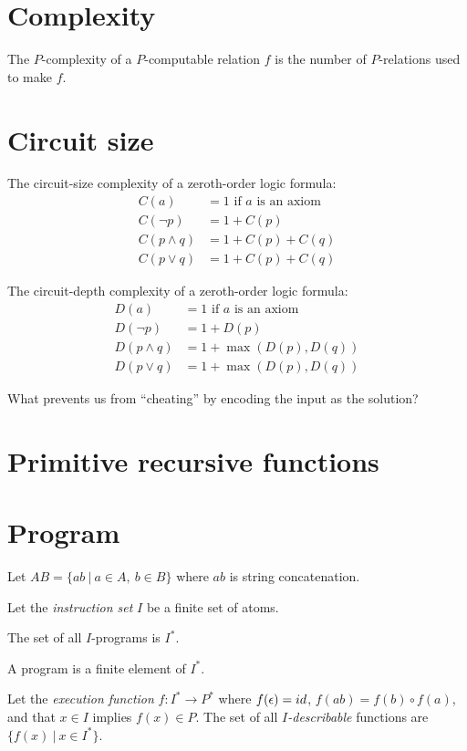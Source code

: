 \section{Complexity}

The \(P\)-complexity of a \(P\)-computable relation \(f\)
is the number of \(P\)-relations used to make \(f\).

\section{Circuit size}

The circuit-size complexity of a zeroth-order logic formula:
\begin{align*}
    C(a) &= 1 \text{ if \(a\) is an axiom}
    \\
    C(\neg p) &= 1 + C(p)
    \\
    C(p \wedge q) &= 1 + C(p) + C(q)
    \\
    C(p \vee q) &= 1 + C(p) + C(q)
\end{align*}

The circuit-depth complexity of a zeroth-order logic formula:
\begin{align*}
    D(a) &= 1 \text{ if \(a\) is an axiom}
    \\
    D(\neg p) &= 1 + D(p)
    \\
    D(p \wedge q) &= 1 + \max(D(p),D(q))
    \\
    D(p \vee q) &= 1 + \max(D(p),D(q))
\end{align*}

What prevents us from ``cheating'' by encoding the input as the solution?

\section{Primitive recursive functions}

\section{Program}

Let \(AB = \{ ab ~|~ a \in A, ~ b \in B \}\)
where \(ab\) is string concatenation.

Let the \emph{instruction set} \(I\) be a finite set of atoms.

The set of all \(I\)-programs is \(I^*\).

A program is a finite element of \(I^*\).

Let the \emph{execution function} \(f : I^* \to P^*\)
where
\(f(\epsilon) = id\),
\(f(ab) = f(b) \circ f(a)\),
and that \(x \in I\) implies \(f(x) \in P\).
The set of all \emph{\(I\)-describable} functions are \(\{ f(x) ~|~ x \in I^* \}\).

